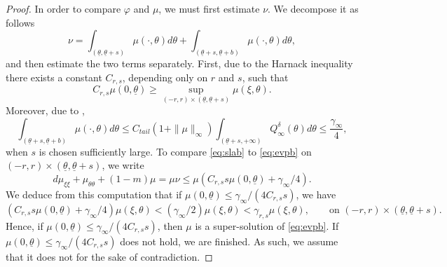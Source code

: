 \documentclass[11pt]{article}    %
\begin{document}
\begin{proof}
In order to compare $\varphi$ and $\mu$, we must first estimate $\nu$. We decompose it as follows 
\begin{equation*}
\nu = \int_{(\underline\theta, \underline\theta + s)} \mu(\cdot,\theta) d\theta + \int_{(\underline\theta + s, \underline\theta + b)} \mu(\cdot,\theta) d\theta, 
\end{equation*} 
and then estimate the two terms separately. 
First, due to the Harnack inequality %
there exists a constant $C_{r,s}$, depending only on $r$ and $s$, such that
\begin{equation*}
C_{r,s} \mu(0,\underline\theta)
	\geq \sup_{(-r,r) \times (\underline\theta, \underline\theta + s)} \mu(\xi , \theta).
\end{equation*}
Moreover, due to , 
\begin{equation*}
\int_{(\underline\theta + s, \underline\theta + b)} \mu(\cdot,\theta) d\theta \leq C_{tail} (1 + \|\mu\|_\infty)  \int_{(\underline\theta + s, +\infty)} Q_\infty^\delta(\theta) d\theta \leq \frac{\gamma_\infty}{4},
\end{equation*}
when $s$ is chosen sufficiently large. To compare \eqref{eq:slab} to \eqref{eq:evpb} on $(-r,r) \times (\underline\theta, \underline\theta + s)$, we write
\begin{equation*}
d \mu_{\xi\xi} + \mu_{\theta\theta} + (1-m) \mu = \mu \nu \leq \mu \left( C_{r,s} s \mu(0,\underline\theta) + \gamma_\infty/4 \right).
\end{equation*}
We deduce from this computation that if $\mu(0,\underline\theta)  \leq \gamma_\infty/(4C_{r,s} s)$, we have \begin{equation*}
\left( C_{r,s}s  \mu(0,\underline\theta) + \gamma_\infty/4  \right) \mu(\xi,\theta) < (\gamma_\infty/2) \mu(\xi,\theta) < \gamma_{r,s} \mu(\xi,\theta), \qquad \text{on } (-r,r) \times (\underline\theta, \underline\theta + s).
\end{equation*}
Hence, if $\mu(0,\underline\theta) \leq \gamma_\infty/(4C_{r,s}s)$, then $\mu$ is a super-solution of \eqref{eq:evpb}.  If $\mu(0,\underline\theta) \leq \gamma_\infty/(4C_{r,s}s)$ does not hold, we are finished.  As such, we assume that it does not for the sake of contradiction.



\end{proof}
\end{document}
